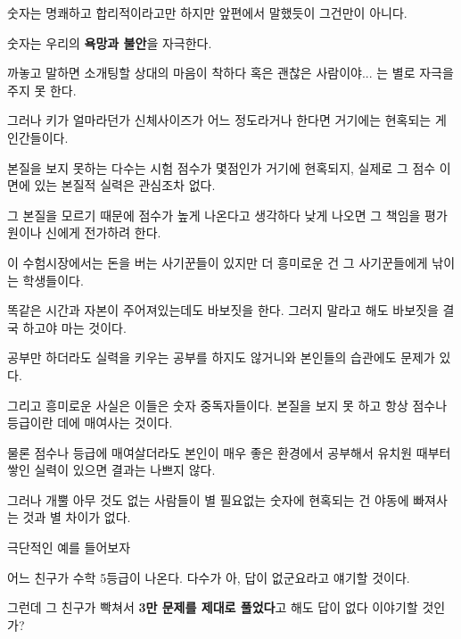 숫자는 명쾌하고 합리적이라고만 하지만 앞편에서 말했듯이 그건만이 아니다.
\vspace{5mm}

숫자는 우리의 \textbf{욕망과 불안}을 자극한다.
\vspace{5mm}

까놓고 말하면 소개팅할 상대의 마음이 착하다 혹은 괜찮은 사람이야... 는 별로 자극을 주지 못 한다.
\vspace{5mm}

그러나 키가 얼마라던가 신체사이즈가 어느 정도라거나 한다면 거기에는 현혹되는 게 인간들이다.
\vspace{5mm}

본질을 보지 못하는 다수는 시험 점수가 몇점인가 거기에 현혹되지, 실제로 그 점수 이면에 있는 본질적 실력은 관심조차 없다.
\vspace{5mm}

그 본질을 모르기 때문에 점수가 높게 나온다고 생각하다 낮게 나오면 그 책임을 평가원이나 신에게 전가하려 한다.
\vspace{5mm}

이 수험시장에서는 돈을 버는 사기꾼들이 있지만 더 흥미로운 건 그 사기꾼들에게 낚이는 학생들이다.
\vspace{5mm}

똑같은 시간과 자본이 주어져있는데도 바보짓을 한다. 그러지 말라고 해도 바보짓을 결국 하고야 마는 것이다.
\vspace{5mm}

공부만 하더라도 실력을 키우는 공부를 하지도 않거니와 본인들의 습관에도 문제가 있다.
\vspace{5mm}

그리고 흥미로운 사실은 이들은 숫자 중독자들이다. 본질을 보지 못 하고 항상 점수나 등급이란 데에 매여사는 것이다.
\vspace{5mm}

물론 점수나 등급에 매여살더라도 본인이 매우 좋은 환경에서 공부해서 유치원 때부터 쌓인 실력이 있으면 결과는 나쁘지 않다.
\vspace{5mm}

그러나 개뿔 아무 것도 없는 사람들이 별 필요없는 숫자에 현혹되는 건 야동에 빠져사는 것과 별 차이가 없다.
\vspace{5mm}

극단적인 예를 들어보자
\vspace{5mm}

어느 친구가 수학 5등급이 나온다. 다수가 아, 답이 없군요라고 얘기할 것이다.
\vspace{5mm}

그런데 그 친구가 빡쳐서 \textbf{3만 문제를 제대로 풀었다}고 해도 답이 없다 이야기할 것인가?
\vspace{5mm}

